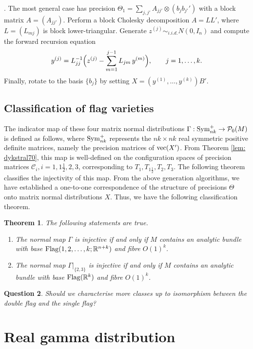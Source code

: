 \documentclass{amsart}
\newtheorem{theorem}{Theorem}[section]
\newtheorem{question}[theorem]{Question}
\theoremstyle{definition}
\numberwithin{equation}{section}
\begin{document}
. The most general case has precision \(\Theta_1 = \sum_{j,j'} A_{jj'}\otimes(b_j b_{j'}')\) with a block matrix \(A=(A_{jj'})\).  Perform a block Cholesky decomposition \(A = LL'\), where \(L = (L_{mj})\) is block lower-triangular.  Generate \(z^{(j)}\sim_{i.i.d.} N(0,I_n)\) and compute the forward recursion equation
\[
y^{(j)} = L_{jj}^{-1}\Bigl(z^{(j)} - \sum_{m=1}^{j-1} L_{jm}\,y^{(m)}\Bigr), \qquad j=1,\dots,k.
\]
Finally, rotate to the basis \(\{b_j\}\) by setting \(X = (y^{(1)},\dots,y^{(k)})B'\). 

\subsection{Classification of flag varieties}

The indicator map of these four matrix normal distributions $\Gamma: {\rm Sym}_{nk}^+ \to \mathcal{P}_{0}(M)$ is defined as follows, where ${\rm Sym}_{nk}^+$ represents the $nk\times nk$ real symmetric positive definite matrices, namely the precision matrices of ${\rm vec}(X')$. From Theorem \ref{lem: dykstral70}, this map is well-defined on the configuration spaces of precision matrices $\mathcal{C}_i, i =1,1\frac{1}{2},2,3$, corresponding to $T_1,T_{1\frac{1}{2}},T_2,T_3$. The following theorem classifies the injectivity of this map. From the above generation algorithms, we have established a one-to-one correspondence of the structure of precisions $\varTheta$ onto matrix normal distributions $X$. Thus, we have the following classification theorem.


\begin{theorem} The following statements are true.
\begin{enumerate}
    \item The normal map $\Gamma$ is injective if and only if $M$ contains an analytic bundle with base ${\rm Flag}(1,2,\dots,k;\mathbb R^{n+k})$ and fibre $O(1)^k$.
    \item The normal map $\Gamma|_{\{2,3\}}$ is injective if and only if $M$ contains an analytic bundle with base ${\rm Flag}(\mathbb R^{k})$ and fibre $O(1)^k$.
\end{enumerate}
\label{thm: flag}
\end{theorem}
\begin{question}
    Should we characterise more classes up to isomorphism between the double flag and the single flag?
\end{question}


\section{Real gamma distribution}
\end{document}
